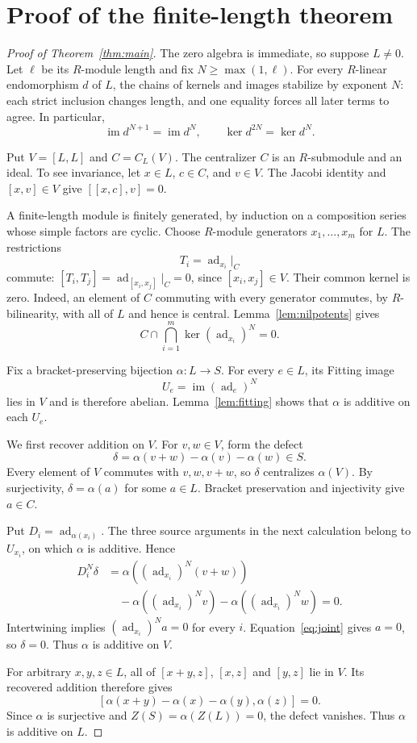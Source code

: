 \documentclass[11pt]{article}
\theoremstyle{definition}
\DeclareMathOperator{\ad}{ad}
\DeclareMathOperator{\im}{im}
\begin{document}
\section{Proof of the finite-length theorem}
\begin{proof}[Proof of Theorem~\ref{thm:main}]
The zero algebra is immediate, so suppose $L\ne0$. Let $\ell$ be its $R$-module length and fix $N\ge\max(1,\ell)$. For every $R$-linear endomorphism $d$ of $L$, the chains of kernels and images stabilize by exponent $N$: each strict inclusion changes length, and one equality forces all later terms to agree. In particular,
\[
 \im d^{N+1}=\im d^N,\qquad \ker d^{2N}=\ker d^N.
\]

Put $V=[L,L]$ and $C=C_L(V)$. The centralizer $C$ is an $R$-submodule and an ideal. To see invariance, let $x\in L$, $c\in C$, and $v\in V$. The Jacobi identity and $[x,v]\in V$ give $[[x,c],v]=0$.

A finite-length module is finitely generated, by induction on a composition series whose simple factors are cyclic. Choose $R$-module generators $x_1,\ldots,x_m$ for $L$. The restrictions
\[
 T_i=\ad_{x_i}|_C
\]
commute: $[T_i,T_j]=\ad_{[x_i,x_j]}|_C=0$, since $[x_i,x_j]\in V$. Their common kernel is zero. Indeed, an element of $C$ commuting with every generator commutes, by $R$-bilinearity, with all of $L$ and hence is central. Lemma~\ref{lem:nilpotents} gives
\begin{equation}\label{eq:joint}
 C\cap\bigcap_{i=1}^m\ker(\ad_{x_i})^N=0.
\end{equation}

Fix a bracket-preserving bijection $\alpha:L\to S$. For every $e\in L$, its Fitting image
\[
 U_e=\im(\ad_e)^N
\]
lies in $V$ and is therefore abelian. Lemma~\ref{lem:fitting} shows that $\alpha$ is additive on each $U_e$.

We first recover addition on $V$. For $v,w\in V$, form the defect
\[
 \delta=\alpha(v+w)-\alpha(v)-\alpha(w)\in S.
\]
Every element of $V$ commutes with $v,w,v+w$, so $\delta$ centralizes $\alpha(V)$. By surjectivity, $\delta=\alpha(a)$ for some $a\in L$. Bracket preservation and injectivity give $a\in C$.

Put $D_i=\ad_{\alpha(x_i)}$. The three source arguments in the next calculation belong to $U_{x_i}$, on which $\alpha$ is additive. Hence
\begin{align*}
 D_i^N\delta
 &=\alpha((\ad_{x_i})^N(v+w))\\
 &\quad-\alpha((\ad_{x_i})^Nv)-\alpha((\ad_{x_i})^Nw)=0.
\end{align*}
Intertwining implies $(\ad_{x_i})^Na=0$ for every $i$. Equation~\eqref{eq:joint} gives $a=0$, so $\delta=0$. Thus $\alpha$ is additive on $V$.

For arbitrary $x,y,z\in L$, all of $[x+y,z]$, $[x,z]$ and $[y,z]$ lie in $V$. Its recovered addition therefore gives
\[
 [\alpha(x+y)-\alpha(x)-\alpha(y),\alpha(z)]=0.
\]
Since $\alpha$ is surjective and $Z(S)=\alpha(Z(L))=0$, the defect vanishes. Thus $\alpha$ is additive on $L$.
\end{proof}
\end{document}
